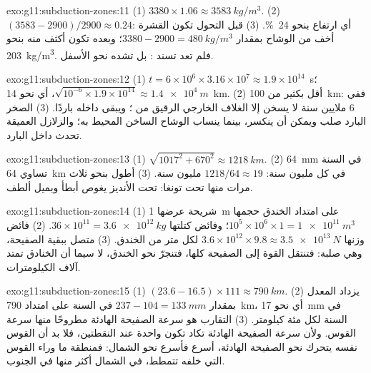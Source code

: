 \begin{solution}{exo:g11:subduction-zones:11}
(1) $3380 \times 1.06 \approx \qty{3583}{kg/m^3}$. (2)
$(3583 - 2900)/2900 \approx 0.24$: أي ارتفاع بنحو \qty{24}{\percent}.
(3) قبل التحول تكون القشرة أخف من الوشاح بمقدار
$3380 - 2900 = \qty{480}{kg/m^3}$؛ وبعده تكون أكثف منه بنحو
\qty{203}{kg/m^3}. فلم تعد تسند : بل تشده نحو الأسفل.
\end{solution}

\begin{solution}{exo:g11:subduction-zones:12}
(1) $t = 6 \times 10^6 \times 3.16 \times 10^7 \approx 1.9 \times 10^{14}$~\unit{s}؛
$\sqrt{10^{-6} \times 1.9 \times 10^{14}} \approx \qty{1.4e4}{m}$، أي نحو
\qty{14}{km}. (2) أقل بكثير من \qty{100}{km}: ففي 6 ملايين سنة لا يسخن إلا
الغلاف الخارجي الرقيق من ؛ ويبقى داخله باردًا. (3) الصخر البارد
صلب ويمكن أن ينكسر، بينما ينساب الوشاح الساخن المحيط به؛ والزلازل
العميقة تحدث داخل  البارد.
\end{solution}

\begin{solution}{exo:g11:subduction-zones:13}
(1) $\sqrt{1017^2 + 670^2} \approx \qty{1218}{km}$. (2) \qty{64}{mm} في السنة
تساوي \qty{64}{km} في كل مليون سنة: $1218/64 \approx 19$ مليون سنة.
(3) أطول بنحو ثلاث مرات منها تحت تونغا:  تحت الأنديز
يغوص أبطأ وبميل ألطف.
\end{solution}

\begin{solution}{exo:g11:subduction-zones:14}
(1) شريحة عرضها \qty{1}{m} على امتداد الخندق حجمها
$10^5 \times 10^6 \times 1 = \qty{1e11}{m^3}$؛ وفائض كتلتها
$36 \times 10^{11} = \qty{3.6e12}{kg}$. (2) فائض وزنها
$3.6 \times 10^{12} \times 9.8 \approx \qty{3.5e13}{N}$ لكل متر من
الخندق. (3)  متصل ببقية الصفيحة، وهي صلبة:
فتنتقل القوة إلى الصفيحة كلها، فتنجرّ نحو
الخندق، لا سيما أن الخنادق تمتد آلاف الكيلومترات.
\end{solution}

\begin{solution}{exo:g11:subduction-zones:15}
(1) $(23.6 - 16.5) \times 111 \approx \qty{790}{km}$. (2) يزداد المعدل بمقدار
$237 - 104 = \qty{133}{mm}$ في السنة على امتداد \qty{790}{km}، أي نحو \qty{17}{mm} في
السنة لكل مئة كيلومتر. (3) التقارب هو سرعة الصفيحة
الهادئة مطروحًا منها سرعة القوس. ولأن سرعة الصفيحة الهادئة تكاد
تكون واحدة عند النقطتين، فلا بد أن القوس نفسه يتحرك نحو
الصفيحة الهادئة، أسرع فأسرع نحو الشمال: فمنطقة ما وراء القوس التي خلفه
تتمطط، في الشمال أكثر منها في الجنوب.
\end{solution}


